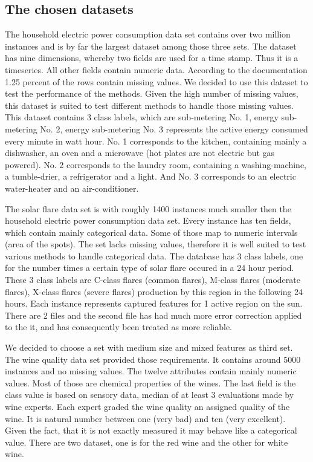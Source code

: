 \documentclass[a4paper]{article}
\begin{document}
\subsection{The chosen datasets}
The household electric power consumption data set contains over two million
instances and is by far the largest dataset among those three sets. The dataset
has nine dimensions, whereby two fields are used for a time stamp. Thus it is a
timeseries. All other fields contain numeric data. According to the
documentation 1.25 percent of the rows contain missing values. We decided to use
this dataset to test the performance of the methods. Given the high number of
missing values, this dataset is suited to test different methods to handle those
missing values. This dataset contains 3 class labels, which are sub-metering No. 1, 
energy sub-metering No. 2,  energy sub-metering No. 3 represents the active energy 
consumed every minute in watt hour. No. 1 corresponds to the kitchen, containing mainly 
a dishwasher, an oven and a microwave (hot plates are not electric but gas powered). 
No. 2 corresponds to the laundry room, containing a washing-machine, a tumble-drier, 
a refrigerator and a light. And No. 3 corresponds to an electric water-heater and an air-conditioner. 

The solar flare data set is with roughly 1400 instances much smaller then the
household electric power consumption data set. Every instance has ten fields,
which contain mainly categorical data. Some of those map to numeric intervals
(area of the spots). The set lacks missing values, therefore it is well suited
to test various methods to handle categorical data. The database has 3 class labels, 
one for the number times a certain type of solar flare occured in a 24 hour period. 
These 3 class labels are C-class flares (common flares), M-class flares (moderate flares), 
X-class flares (severe flares) production by this region in the following 24 hours. 
Each instance represents captured features for 1 active region on the sun. 
There are 2 files and the second file has had much more error correction applied to the it, 
and has consequently been treated as more reliable. 

We decided to choose a set with medium size and mixed features as third set. The
wine quality data set provided those requirements. It contains around 5000
instances and no missing values. The twelve attributes contain mainly numeric
values. Most of those are chemical properties of the wines. The last field is
the class value is based on sensory data, median of at least 3 evaluations made by wine experts. 
Each expert graded the wine quality  an assigned quality of the wine. It is natural number 
between one (very bad) and ten (very excellent).
Given the fact, that it is not exactly measured it may behave like a
categorical value. There are two dataset, one is for the red wine and the other for white wine.
\end{document}
